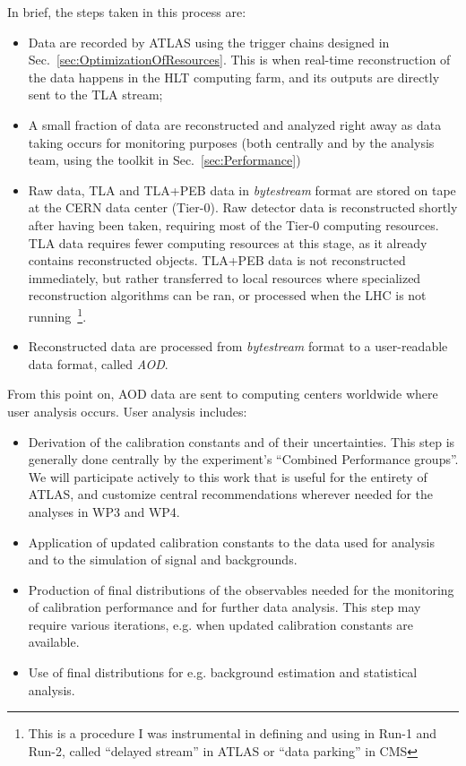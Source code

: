 In brief, the steps taken in this process are:

\begin{itemize}

\item Data are recorded by ATLAS using the trigger chains designed in Sec.~\ref{sec:OptimizationOfResources}. This is when real-time reconstruction of the data happens in the HLT computing farm, and its outputs are directly sent to the TLA stream;
\item A small fraction of data are reconstructed and analyzed right away as data taking occurs for monitoring purposes (both centrally and by the analysis team, using the toolkit in Sec.~\ref{sec:Performance})
\item Raw data, TLA and TLA+PEB data in \textit{bytestream} format are stored on tape at the CERN data center (Tier-0). 
Raw detector data is reconstructed shortly after having been taken, requiring most of the Tier-0 computing resources. 
TLA data requires fewer computing resources at this stage, as it already contains reconstructed objects. 
TLA+PEB data is not reconstructed immediately, but rather transferred to local resources where specialized reconstruction algorithms can be ran, or processed when the LHC is not running~\footnote{This is a procedure I was instrumental in defining and using in Run-1 and Run-2, called “delayed stream” in ATLAS or “data parking” in CMS}. 
\item Reconstructed data are processed from \textit{bytestream} format to a user-readable data format, called \textit{AOD}.  

\end{itemize}

From this point on, AOD data are sent to computing centers worldwide where user analysis occurs. User analysis includes:

\begin{itemize}
\item Derivation of the calibration constants and of their uncertainties. This step is generally done centrally by the experiment’s “Combined Performance groups”. We will participate actively to this work that is useful for the entirety of ATLAS, and customize central recommendations wherever needed for the analyses in WP3 and WP4. 
\item Application of updated calibration constants to the data used for analysis and to the simulation of signal and backgrounds.  
\item Production of final distributions of the observables needed for the monitoring of calibration performance and for further data analysis. This step may require various iterations, e.g. when updated calibration constants are available. 
\item Use of final distributions for e.g. background estimation and statistical analysis.
\end{itemize}

